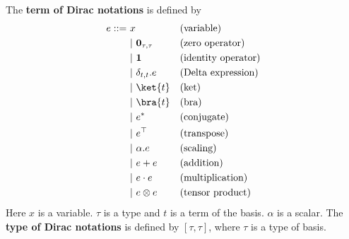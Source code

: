 \begin{definition}
  The \textbf{term of Dirac notations} is defined by
  \begin{align*}
    e ::= \ 
      &    x                          && \text{(variable)} \\
      & |\ \mathbf{0}_{\tau, \tau}    && \text{(zero operator)}\\
      & |\ \mathbf{1}                 && \text{(identity operator)}\\
      & |\ \delta_{t, t}.e            && \text{(Delta expression)} \\
      & |\ \ket{t}                    && \text{(ket)} \\
      & |\ \bra{t}                    && \text{(bra)} \\
      & |\ e^*                        && \text{(conjugate)} \\
      & |\ e^\top                        && \text{(transpose)} \\
      & |\ \alpha.e                   && \text{(scaling)} \\
      & |\ e + e                      && \text{(addition)} \\
      & |\ e \cdot e                  && \text{(multiplication)} \\
      & |\ e \otimes e                && \text{(tensor product)}
  \end{align*}
  Here $x$ is a variable. $\tau$ is a type and $t$ is a term of the basis. $\alpha$ is a scalar. 
  The \textbf{type of Dirac notations} is defined by $[\tau, \tau]$, where $\tau$ is a type of basis.
\end{definition}

